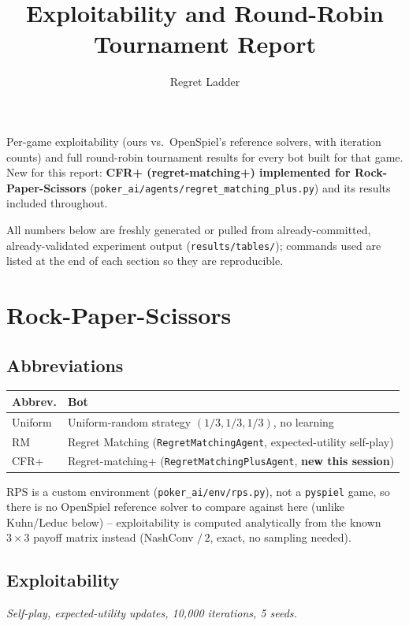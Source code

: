 \documentclass[11pt]{article}
\title{Exploitability and Round-Robin Tournament Report}
\author{Regret Ladder}
\date{}
\newcommand{\code}[1]{\texttt{#1}}
\newcommand{\highlight}[1]{\textbf{#1}}
\begin{document}
\maketitle

Per-game exploitability (ours vs.\ OpenSpiel's reference solvers, with iteration
counts) and full round-robin tournament results for every bot built for that game.
New for this report: \highlight{CFR+ (regret-matching+) implemented for
Rock-Paper-Scissors} (\code{poker\_ai/agents/regret\_matching\_plus.py}) and its
results included throughout.

All numbers below are freshly generated or pulled from already-committed,
already-validated experiment output (\code{results/tables/}); commands used are
listed at the end of each section so they are reproducible.

\section{Rock-Paper-Scissors}

\subsection*{Abbreviations}
\begin{center}
\begin{tabular}{ll}
\toprule
Abbrev. & Bot \\
\midrule
Uniform & Uniform-random strategy $(1/3, 1/3, 1/3)$, no learning \\
RM & Regret Matching (\code{RegretMatchingAgent}, expected-utility self-play) \\
CFR+ & Regret-matching+ (\code{RegretMatchingPlusAgent}, \textbf{new this session}) \\
\bottomrule
\end{tabular}
\end{center}

RPS is a custom environment (\code{poker\_ai/env/rps.py}), not a \code{pyspiel} game,
so there is no OpenSpiel reference solver to compare against here (unlike Kuhn/Leduc
below) -- exploitability is computed analytically from the known $3\times 3$ payoff
matrix instead (NashConv $/\,2$, exact, no sampling needed).

\subsection*{Exploitability}
\emph{Self-play, expected-utility updates, 10{,}000 iterations, 5 seeds.}
\end{document}
